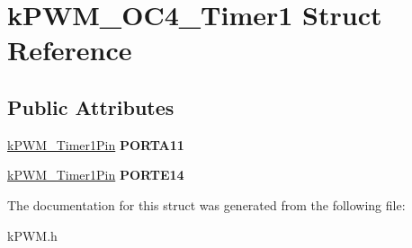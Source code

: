 \hypertarget{structkPWM__OC4__Timer1}{}\section{k\+P\+W\+M\+\_\+\+O\+C4\+\_\+\+Timer1 Struct Reference}
\label{structkPWM__OC4__Timer1}
\subsection*{Public Attributes}
\begin{DoxyCompactItemize}
\item 
\hyperlink{structkPWM__Timer1Pin}{k\+P\+W\+M\+\_\+\+Timer1\+Pin} {\bfseries P\+O\+R\+T\+A11}\hypertarget{structkPWM__OC4__Timer1_aca42e35f51af32f4669a931e84a3920d}{}\label{structkPWM__OC4__Timer1_aca42e35f51af32f4669a931e84a3920d}

\item 
\hyperlink{structkPWM__Timer1Pin}{k\+P\+W\+M\+\_\+\+Timer1\+Pin} {\bfseries P\+O\+R\+T\+E14}\hypertarget{structkPWM__OC4__Timer1_a9c1f74525b9a36fba14244fa03af8eba}{}\label{structkPWM__OC4__Timer1_a9c1f74525b9a36fba14244fa03af8eba}

\end{DoxyCompactItemize}


The documentation for this struct was generated from the following file\+:\begin{DoxyCompactItemize}
\item 
k\+P\+W\+M.\+h\end{DoxyCompactItemize}
